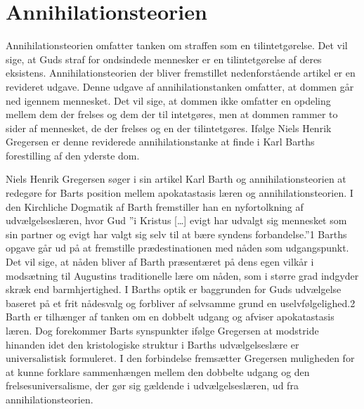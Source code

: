\chapter{Annihilationsteorien}
Annihilationsteorien omfatter tanken om straffen som en tilintetgørelse. Det vil sige, at Guds straf for ondsindede mennesker er en tilintetgørelse af deres eksistens. Annihilationsteorien der bliver fremstillet nedenforstående artikel er en revideret udgave. Denne udgave af annihilationstanken omfatter, at dommen går ned igennem mennesket. Det vil sige, at dommen ikke omfatter en opdeling mellem dem der frelses og dem der til intetgøres, men at dommen rammer to sider af mennesket, de der frelses og en der tilintetgøres. Ifølge Niels Henrik Gregersen er denne reviderede annihilationstanke at finde i Karl Barths forestilling af den yderste dom.   

Niels Henrik Gregersen søger i sin artikel Karl Barth og annihilationsteorien at redegøre for Barts position mellem apokatastasis læren og annihilationsteorien.
I den Kirchliche Dogmatik af Barth fremstiller han en nyfortolkning af udvælgelseslæren, hvor Gud ”i Kristus […] evigt har udvalgt sig mennesket som sin partner og evigt har valgt sig selv til at bære syndens forbandelse.”1 Barths opgave går ud på at fremstille prædestinationen med nåden som udgangspunkt. Det vil sige, at nåden bliver af Barth præsentæret på dens egen vilkår i modsætning til Augustins traditionelle lære om nåden, som i større grad indgyder skræk end barmhjertighed. I Barths optik er baggrunden for Guds udvælgelse baseret på et frit nådesvalg og forbliver af selvsamme grund en uselvfølgelighed.2 Barth er tilhænger af tanken om en dobbelt udgang og afviser apokatastasis læren. Dog forekommer Barts synspunkter ifølge Gregersen at modstride hinanden idet den kristologiske struktur i Barths udvælgelseslære er universalistisk formuleret. I den forbindelse fremsætter Gregersen muligheden for at kunne forklare sammenhængen mellem den dobbelte udgang og den frelsesuniversalisme, der gør sig gældende i udvælgelseslæren, ud fra annihilationsteorien.

